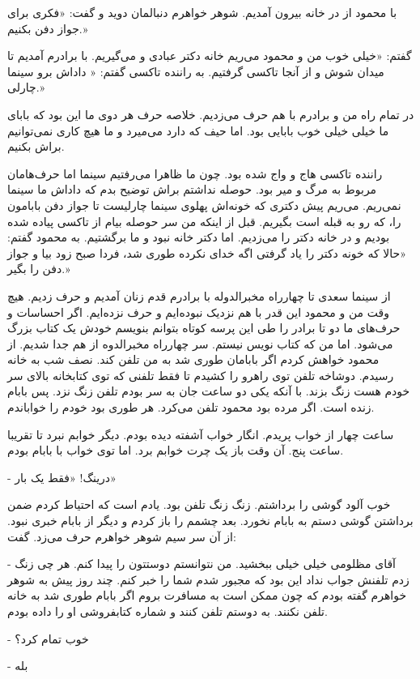\documentclass[12pt,a4paper]{book}
\begin{document}
با محمود از در خانه بیرون آمدیم. شوهر خواهرم دنبالمان دوید و گفت: «فکری برای جواز دفن بکنیم.»

گفتم: «خیلی خوب من و محمود می‌ریم خانه دکتر عبادی و می‌گیریم. با برادرم آمدیم تا میدان شوش و از آنجا تاکسی گرفتیم. به راننده تاکسی گفتم: « داداش برو سینما چارلی.»

در تمام راه من و برادرم با هم حرف می‌زدیم. خلاصه حرف هر دوی ما این بود که بابای ما خیلی خیلی خوب بابایی بود. اما حیف که دارد می‌میرد و ما هیچ کاری نمی‌توانیم براش بکنیم.

راننده تاکسی هاج و واج شده بود. چون ما ظاهرا می‌رفتیم سینما اما حرف‌هامان مربوط به مرگ و میر بود. حوصله نداشتم براش توضیح بدم که داداش ما سینما نمی‌ریم. می‌ریم پیش دکتری که خونه‌اش پهلوی سینما چارلیست تا جواز دفن بابامون را، که رو به قبله است بگیریم. قبل از اینکه من سر حوصله بیام از تاکسی پیاده شده بودیم و در خانه دکتر را می‌زدیم. اما دکتر خانه نبود و ما برگشتیم. به محمود گفتم: «حالا که خونه دکتر را یاد گرفتی اگه خدای نکرده طوری شد، فردا صبح زود بیا و جواز دفن را بگیر.»

از سینما سعدی تا چهارراه مخبرالدوله با برادرم قدم زنان آمدیم و حرف زدیم. هیچ وقت من و محمود این قدر با هم نزدیک نبوده‌ایم و حرف نزده‌ایم. اگر احساسات و حرف‌های ما دو تا برادر را طی این پرسه کوتاه بتوانم بنویسم خودش یک کتاب بزرگ می‌شود. اما من که کتاب نویس نیستم. سر چهارراه مخبرالدوه از هم جدا شدیم. از محمود خواهش کردم اگر بابامان طوری شد به من تلفن کند. نصف شب به خانه رسیدم. دوشاخه تلفن توی راهرو را کشیدم تا فقط تلفنی که توی کتابخانه بالای سر خودم هست زنگ بزند. با آنکه یکی دو ساعت جان به سر بودم تلفن زنگ نزد. پس بابام زنده است. اگر مرده بود محمود تلفن می‌کرد. هر طوری بود خودم را خواباندم.

ساعت چهار از خواب پریدم. انگار خواب آشفته دیده بودم. دیگر خوابم نبرد تا تقریبا ساعت پنج. آن وقت باز یک چرت خوابم برد. اما توی خواب با بابام بودم.

- درینگ! «فقط یک بار»

خوب آلود گوشی را برداشتم. زنگ زنگ تلفن بود. یادم است که احتیاط کردم ضمن برداشتن گوشی دستم به بابام نخورد. بعد چشمم را باز کردم و دیگر از بابام خبری نبود. از آن سر سیم شوهر خواهرم حرف می‌زد. گفت:

- آقای مظلومی خیلی خیلی ببخشید. من نتوانستم دوستتون را پیدا کنم. هر چی زنگ زدم تلفنش جواب نداد این بود که مجبور شدم شما را خبر کنم. چند روز پیش به شوهر خواهرم گفته بودم که چون ممکن است به مسافرت بروم اگر بابام طوری شد به خانه تلفن نکنند. به دوستم تلفن کنند و شماره کتابفروشی او را داده بودم.

- خوب تمام کرد؟

- بله
\end{document}
